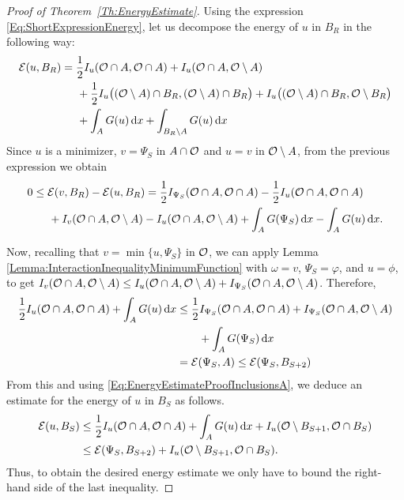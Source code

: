 \begin{proof}[Proof of Theorem~\ref{Th:EnergyEstimate}]
Using the expression \eqref{Eq:ShortExpressionEnergy}, let us decompose the energy of $u$ in $B_R$ in the following way:
\begin{align*}
\mathcal{E}(u,B_R) &= \frac{1}{2}I_u(\mathcal{O} \cap A, \mathcal{O} \cap A) + I_u(\mathcal{O} \cap A, \mathcal{O} \setminus A) \\
& \hspace{5mm} + \frac{1}{2}I_u\big((\mathcal{O} \setminus A) \cap B_R, (\mathcal{O} \setminus A) \cap B_R\big) + I_u\big((\mathcal{O} \setminus A) \cap B_R, \mathcal{O} \setminus B_R\big) \\
& \hspace{5mm} + \int_A G(u) \,\mathrm{d} x + \int_{B_R\setminus A} G(u) \,\mathrm{d} x
\end{align*}
Since $u$ is a minimizer, $v=\Psi_S$ in $A\cap \mathcal{O}$ and $u=v$ in $\mathcal{O}\setminus A$,  from the previous expression we obtain
\begin{align*}
0 &\leq \mathcal{E}(v,B_R)-\mathcal{E}(u,B_R) = \frac{1}{2}I_{\Psi_S}(\mathcal{O} \cap A, \mathcal{O} \cap A) - \frac{1}{2}I_u(\mathcal{O} \cap A, \mathcal{O} \cap A)\\
& \hspace{5mm} + I_v(\mathcal{O} \cap A, \mathcal{O} \setminus A) - I_u(\mathcal{O} \cap A, \mathcal{O} \setminus A) + \int_A G(\Psi_S) \,\mathrm{d} x - \int_{A} G(u) \,\mathrm{d} x.
\end{align*}

Now, recalling that $v = \min\{u,\Psi_S\}$ in $\mathcal{O}$, we can apply Lemma \ref{Lemma:InteractionInequalityMinimumFunction} with $\omega = v$, $\Psi_S = \varphi$, and $u= \phi$, to get $I_v(\mathcal{O} \cap A, \mathcal{O}\setminus A) \leq I_u(\mathcal{O} \cap A, \mathcal{O}\setminus A) + I_{\Psi_S}(\mathcal{O} \cap A, \mathcal{O}\setminus A)$. Therefore,
\begin{align*}
\frac{1}{2}I_u(\mathcal{O} \cap A, \mathcal{O} \cap A) + \int_{A} G(u) \,\mathrm{d} x &\leq \frac{1}{2}I_{\Psi_S}(\mathcal{O} \cap A, \mathcal{O} \cap A) + I_{\Psi_S}(\mathcal{O} \cap A, \mathcal{O} \setminus A) \\
& \quad \quad  + \int_A G(\Psi_S)  \,\mathrm{d} x \\
&= \mathcal{E}(\Psi_S, A) \leq \mathcal{E}(\Psi_S,B_{S+2})
\end{align*}
From this and using \eqref{Eq:EnergyEstimateProofInclusionsA}, we deduce an estimate for the energy of $u$ in $B_S$ as follows.
\begin{align*}
\mathcal{E}(u,B_S) &\leq \frac{1}{2}I_u(\mathcal{O} \cap A, \mathcal{O} \cap A) + \int_{A} G(u) \,\mathrm{d} x + I_u(\mathcal{O} \setminus B_{S+1}, \mathcal{O} \cap B_S) \\
& \leq  \mathcal{E}(\Psi_S,B_{S+2}) + I_u(\mathcal{O} \setminus B_{S+1}, \mathcal{O} \cap B_S).
\end{align*}
Thus, to obtain the desired energy estimate we only have to bound the right-hand side of the last inequality.



\end{proof}
